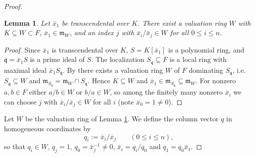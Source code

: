 \documentclass[pdflatex,sn-mathphys-num]{sn-jnl}
\numberwithin{equation}{section}
\theoremstyle{thmstyleone}
\newtheorem{lemma}[theorem]{Lemma}
\theoremstyle{thmstyletwo}
\begin{document}
\begin{proof}
\begin{lemma}\label{lem:W}
Let $\bar x_1$ be transcendental over $K$. There exist a valuation ring $W$ with
$K\subseteq W\subset F$, $\bar x_1\in\mathfrak m_W$, and an
index $j$ with $\bar x_i/\bar x_j\in W$ for all $0\le i\le n$.
\end{lemma}
\begin{proof}
Since $\bar x_1$ is transcendental over $K$, $S=K[\bar x_1]$ is a polynomial
ring, and $\mathfrak q=\bar x_1S$ is a prime ideal of $S$. The localization
$S_{\mathfrak q}\subseteq F$ is a local ring with maximal ideal
$\bar x_1S_{\mathfrak q}$. By \cite[Tag~00IA]{Stacks} there exists a valuation ring
$W$ of $F$ dominating $S_{\mathfrak q}$, i.e.\ $S_{\mathfrak q}\subseteq W$ and
$\mathfrak m_{S_{\mathfrak q}}=\mathfrak m_W\cap S_{\mathfrak q}$. Hence $K\subseteq W$ and
$\bar x_1\in\mathfrak m_{S_{\mathfrak q}}\subseteq\mathfrak m_W$. For nonzero $a,b\in F$ either $a/b\in W$ or $b/a\in W$,
so among the finitely many nonzero $\bar x_i$ we can choose $j$ with
$\bar x_i/\bar x_j\in W$ for all $i$ (note $\bar x_0=1\ne0$).
\end{proof}

Let $W$ be the valuation ring of Lemma \ref{lem:W}. We define the column vector $q$ in homogeneous coordinates by
\[ q_i:=\bar x_i/\bar x_j\qquad(0\le i\le n),\]
so that $q_i\in W$, $q_j=1$, $q_0=\bar x_j^{-1}\neq0$, $\bar x_i=q_i/q_0$ and
$q_1=q_0\bar x_1$.


\end{proof}
\end{document}
